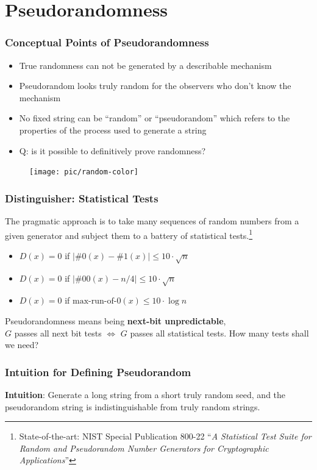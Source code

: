 \section{Pseudorandomness}
\begin{frame}\frametitle{Conceptual Points of Pseudorandomness}
\begin{itemize}
\item True randomness can not be generated by a describable mechanism
\item Pseudorandom looks truly random for the observers who don't know the mechanism 
\item No fixed string can be ``random'' or ``pseudorandom'' which refers to the properties of the process used to generate a string
\item \alert{Q: is it possible to definitively prove randomness?}
\end{itemize}
\begin{figure}
\begin{center}
\texttt{[image: pic/random-color]} 
\end{center}
\end{figure}
\end{frame}
\begin{frame}\frametitle{Distinguisher: Statistical Tests}
The pragmatic approach is to take many sequences of random numbers from a given generator and subject them to a battery of statistical tests.\footnote{State-of-the-art: NIST Special Publication 800-22 ``\emph{A Statistical Test Suite for Random and Pseudorandom Number Generators for Cryptographic Applications}''}
\begin{exampleblock}{}
\begin{itemize}
\item $D(x)=0$ if $\left| \#0(x) - \#1(x)\right| \le 10\cdot \sqrt{n}$
\item $D(x)=0$ if $\left| \#00(x) - n/4\right| \le 10\cdot \sqrt{n}$
\item $D(x)=0$ if $\text{max-run-of-}0(x) \le 10\cdot \log{n}$
\end{itemize}
\end{exampleblock}
Pseudorandomness means being \textbf{next-bit unpredictable},\\
$G$ passes all next bit tests $\iff$ $G$ passes all statistical tests.
How many tests shall we need?
\end{frame}
\begin{frame}\frametitle{Intuition for Defining Pseudorandom}
\textbf{Intuition}: Generate a long string from a short truly random seed, and the pseudorandom string is indistinguishable from truly random strings.
\begin{figure}
\begin{center}

\end{center}
\end{figure}
\end{frame}
